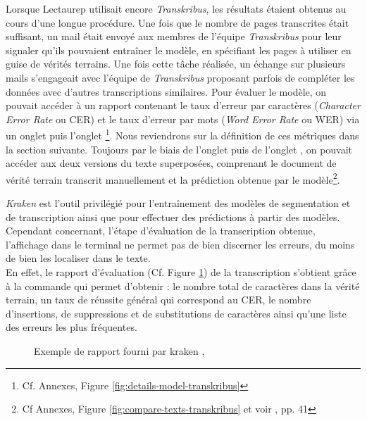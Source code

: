 Lorsque Lectaurep utilisait encore \textit{Transkribus}, les résultats étaient obtenus au cours d'une longue procédure. Une fois que le nombre de pages transcrites était suffisant, un mail était envoyé aux membres de l'équipe \textit{Transkribus} pour leur signaler qu'ils pouvaient entraîner le modèle, en spécifiant les pages à utiliser en guise de vérités terrains. Une fois cette tâche réalisée, un échange sur plusieurs mails s'engageait avec l'équipe de \textit{Transkribus} proposant parfois de compléter les données avec d'autres transcriptions similaires. Pour évaluer le modèle, on pouvait accéder à un rapport contenant le taux d'erreur par caractères (\textit{Character Error Rate} ou CER) et le taux d'erreur par mots (\textit{Word Error Rate} ou WER) via un onglet  puis l'onglet \footnote{Cf. Annexes, Figure \ref{fig:details-model-transkribus}}. Nous reviendrons sur la définition de ces métriques dans la section suivante. 
Toujours par le biais de l'onglet  puis de l'onglet , on pouvait accéder aux deux versions du texte superposées, comprenant le document de vérité terrain transcrit manuellement et la prédiction obtenue par le modèle\footnote{Cf Annexes, Figure \ref{fig:compare-texts-transkribus} et voir \cite{bonhomme_defis_2018}, pp. 41}.

\textit{Kraken} est l'outil privilégié pour l'entraînement des modèles de segmentation et de transcription ainsi que pour effectuer des prédictions à partir des modèles. Cependant concernant, l'étape d'évaluation de la transcription obtenue, l'affichage dans le terminal ne permet pas de bien discerner les erreurs, du moins de bien les localiser dans le texte.\\

En effet, le rapport d'évaluation (Cf. Figure \ref{fig:rapport_Kraken}) de la transcription s'obtient grâce à la commande  qui permet d'obtenir : le nombre total de caractères dans la vérité terrain, un taux de réussite général qui correspond au CER, le nombre d'insertions, de suppressions et de substitutions de caractères ainsi qu'une liste des erreurs les plus fréquentes.

\begin{figure}[h]
    \centering
    \centerline{}
    \caption{Exemple de rapport fourni par kraken , \cite{noauthor_kraken_nodate}}
    \label{fig:rapport_Kraken}
\end{figure} 

